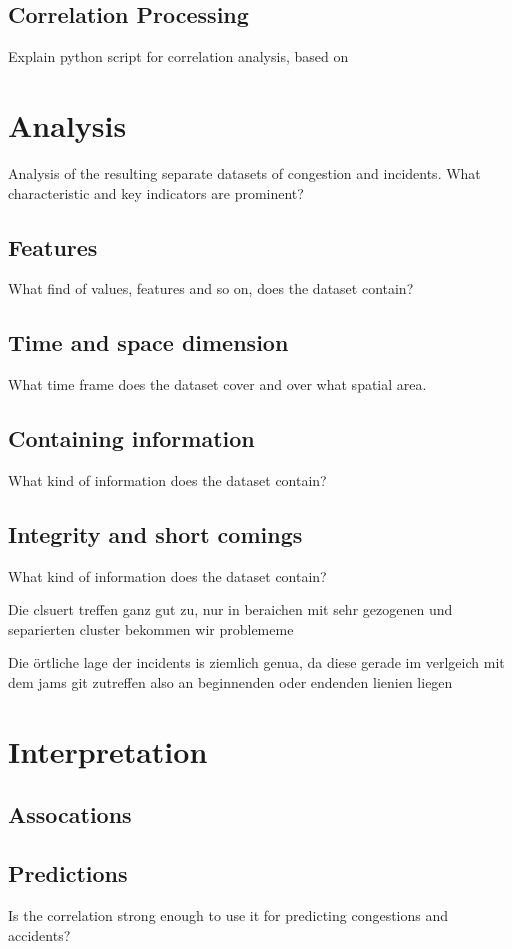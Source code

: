 \documentclass[a4paper,headsepline,footsepline,fontsize=11pt,BCOR=12mm,DIV=12]{report}
\begin{document}
    
\section{Correlation Processing}
\label{definition_correlation_processing}

Explain python script for correlation analysis, based on \cite{Potvin2020}

\chapter{Analysis}

Analysis of the resulting separate datasets of congestion and incidents. What characteristic and key indicators are prominent?
\section{Features}
What find of values, features and so on, does the dataset contain?
\section{Time and space dimension}
What time frame does the dataset cover and over what spatial area.
\section{Containing information}
What kind of information does the dataset contain?
\section{Integrity and short comings}
What kind of information does the dataset contain?


Die clsuert treffen ganz gut zu, nur in beraichen mit sehr gezogenen und separierten cluster bekommen wir problememe

Die örtliche lage der incidents is ziemlich genua, da diese gerade im verlgeich mit dem jams git zutreffen also an beginnenden oder endenden lienien liegen

\chapter{Interpretation}

\section{Assocations}

\section{Predictions}
Is the correlation strong enough to use it for predicting congestions and accidents?
\end{document}
